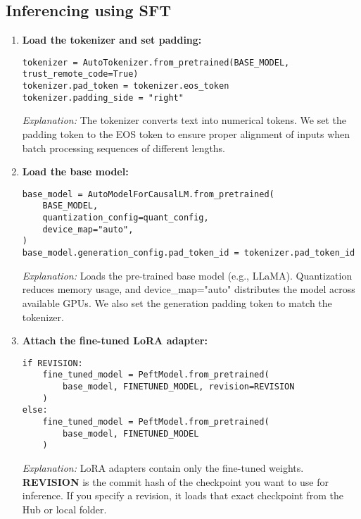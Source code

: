 \subsection{Inferencing using SFT}
\begin{tcolorbox}[colback=green!5!white, colframe=green!80!black, title=\textbf{Running Inference with Fine-tuned Model}, 
                  coltitle=black, fonttitle=\bfseries, enhanced, sharp corners, boxrule=1pt]
\begin{enumerate}
    \item \textbf{Load the tokenizer and set padding:}
    \begin{verbatim}
tokenizer = AutoTokenizer.from_pretrained(BASE_MODEL, trust_remote_code=True)
tokenizer.pad_token = tokenizer.eos_token
tokenizer.padding_side = "right"
    \end{verbatim}
    \textit{Explanation:} The tokenizer converts text into numerical tokens. 
    We set the padding token to the EOS token to ensure proper alignment of inputs 
    when batch processing sequences of different lengths.  

    \item \textbf{Load the base model:}
    \begin{verbatim}
base_model = AutoModelForCausalLM.from_pretrained(
    BASE_MODEL,
    quantization_config=quant_config,
    device_map="auto",
)
base_model.generation_config.pad_token_id = tokenizer.pad_token_id
    \end{verbatim}
    \textit{Explanation:} Loads the pre-trained base model (e.g., LLaMA). 
    Quantization reduces memory usage, and device\_map="auto" distributes 
    the model across available GPUs. We also set the generation padding token 
    to match the tokenizer.  

    \item \textbf{Attach the fine-tuned LoRA adapter:}
    \begin{verbatim}
if REVISION:
    fine_tuned_model = PeftModel.from_pretrained(
        base_model, FINETUNED_MODEL, revision=REVISION
    )
else:
    fine_tuned_model = PeftModel.from_pretrained(
        base_model, FINETUNED_MODEL
    )
    \end{verbatim}
    \textit{Explanation:} LoRA adapters contain only the fine-tuned weights.  
    \textbf{REVISION} is the commit hash of the checkpoint you want to use for inference.  
    If you specify a revision, it loads that exact checkpoint from the Hub or local folder.  
\end{enumerate}
\end{tcolorbox}

